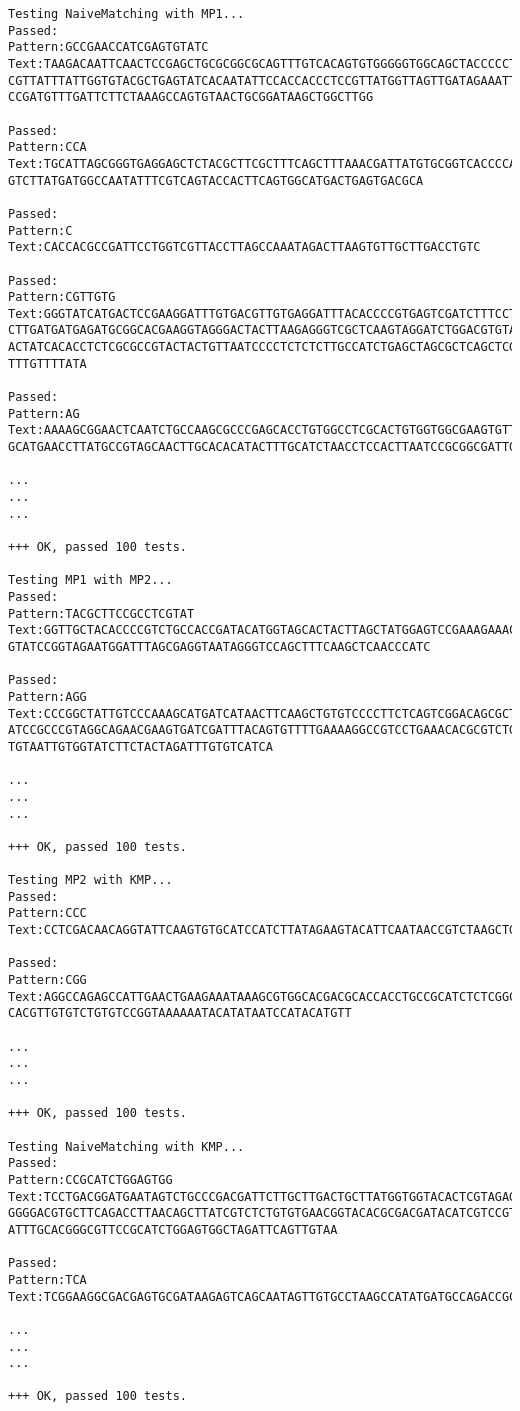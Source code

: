 \begin{verbatim}
Testing NaiveMatching with MP1...
Passed:
Pattern:GCCGAACCATCGAGTGTATC
Text:TAAGACAATTCAACTCCGAGCTGCGCGGCGCAGTTTGTCACAGTGTGGGGGTGGCAGCTACCCCCTAAG
CGTTATTTATTGGTGTACGCTGAGTATCACAATATTCCACCACCCTCCGTTATGGTTAGTTGATAGAAATTCGA
CCGATGTTTGATTCTTCTAAAGCCAGTGTAACTGCGGATAAGCTGGCTTGG

Passed:
Pattern:CCA
Text:TGCATTAGCGGGTGAGGAGCTCTACGCTTCGCTTTCAGCTTTAAACGATTATGTGCGGTCACCCCAATT
GTCTTATGATGGCCAATATTTCGTCAGTACCACTTCAGTGGCATGACTGAGTGACGCA

Passed:
Pattern:C
Text:CACCACGCCGATTCCTGGTCGTTACCTTAGCCAAATAGACTTAAGTGTTGCTTGACCTGTC

Passed:
Pattern:CGTTGTG
Text:GGGTATCATGACTCCGAAGGATTTGTGACGTTGTGAGGATTTACACCCCGTGAGTCGATCTTTCCTGGT
CTTGATGATGAGATGCGGCACGAAGGTAGGGACTACTTAAGAGGGTCGCTCAAGTAGGATCTGGACGTGTACAG
ACTATCACACCTCTCGCGCCGTACTACTGTTAATCCCCTCTCTCTTGCCATCTGAGCTAGCGCTCAGCTCGATA
TTTGTTTTATA

Passed:
Pattern:AG
Text:AAAAGCGGAACTCAATCTGCCAAGCGCCCGAGCACCTGTGGCCTCGCACTGTGGTGGCGAAGTGTTAAG
GCATGAACCTTATGCCGTAGCAACTTGCACACATACTTTGCATCTAACCTCCACTTAATCCGCGGCGATTGCAT

...
...
...

+++ OK, passed 100 tests.

Testing MP1 with MP2...
Passed:
Pattern:TACGCTTCCGCCTCGTAT
Text:GGTTGCTACACCCCGTCTGCCACCGATACATGGTAGCACTACTTAGCTATGGAGTCCGAAAGAAACCAG
GTATCCGGTAGAATGGATTTAGCGAGGTAATAGGGTCCAGCTTTCAAGCTCAACCCATC

Passed:
Pattern:AGG
Text:CCCGGCTATTGTCCCAAAGCATGATCATAACTTCAAGCTGTGTCCCCTTCTCAGTCGGACAGCGCTAGA
ATCCGCCCGTAGGCAGAACGAAGTGATCGATTTACAGTGTTTTGAAAAGGCCGTCCTGAAACACGCGTCTGTTA
TGTAATTGTGGTATCTTCTACTAGATTTGTGTCATCA

...
...
...

+++ OK, passed 100 tests.

Testing MP2 with KMP...
Passed:
Pattern:CCC
Text:CCTCGACAACAGGTATTCAAGTGTGCATCCATCTTATAGAAGTACATTCAATAACCGTCTAAGCTGCTG

Passed:
Pattern:CGG
Text:AGGCCAGAGCCATTGAACTGAAGAAATAAAGCGTGGCACGACGCACCACCTGCCGCATCTCTCGGCGCA
CACGTTGTGTCTGTGTCCGGTAAAAAATACATATAATCCATACATGTT

...
...
...

+++ OK, passed 100 tests.

Testing NaiveMatching with KMP...
Passed:
Pattern:CCGCATCTGGAGTGG
Text:TCCTGACGGATGAATAGTCTGCCCGACGATTCTTGCTTGACTGCTTATGGTGGTACACTCGTAGAGGGT
GGGGACGTGCTTCAGACCTTAACAGCTTATCGTCTCTGTGTGAACGGTACACGCGACGATACATCGTCCGTAGG
ATTTGCACGGGCGTTCCGCATCTGGAGTGGCTAGATTCAGTTGTAA

Passed:
Pattern:TCA
Text:TCGGAAGGCGACGAGTGCGATAAGAGTCAGCAATAGTTGTGCCTAAGCCATATGATGCCAGACCGCCGTCATCACTCTCGTAGTCAGGCACTTGAGCTTAAGGTTATCAATTTATCGGGTATTTTTGACATGGCAGGTAAGGGGGATCGCTTTAGCATGTTAGTAACCCGAAAGACATGATTTTGACATCTCACACGTAGTTATGGAAGCAACTGCCCTACGGCTCCAGGCGAGCCAACTGCGCCTAGTGGGTGTGCCTGCGCTTAACGACCACTGATTGGTTAGTCTGATCCACGAGGGCGGCCAAGGACAAGCATAGACCTGGGCCCCCCTCGGTGCGGCACTAAGATATATCCTGATGGACCACCGATATTTTAATGTGGGCACCTACAGGATTCATATGTCAATTATACGATAGATAAAGGATGACCGGGACACACATCGA

...
...
...

+++ OK, passed 100 tests.
\end{verbatim}

